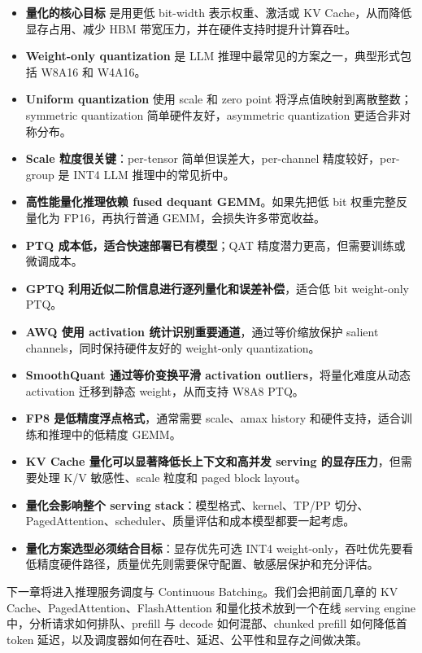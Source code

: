 \begin{itemize}
\item \textbf{量化的核心目标} 是用更低 bit-width 表示权重、激活或 KV Cache，从而降低显存占用、减少 HBM 带宽压力，并在硬件支持时提升计算吞吐。
\item \textbf{Weight-only quantization} 是 LLM 推理中最常见的方案之一，典型形式包括 W8A16 和 W4A16。
\item \textbf{Uniform quantization} 使用 scale 和 zero point 将浮点值映射到离散整数；symmetric quantization 简单硬件友好，asymmetric quantization 更适合非对称分布。
\item \textbf{Scale 粒度很关键}：per-tensor 简单但误差大，per-channel 精度较好，per-group 是 INT4 LLM 推理中的常见折中。
\item \textbf{高性能量化推理依赖 fused dequant GEMM}。如果先把低 bit 权重完整反量化为 FP16，再执行普通 GEMM，会损失许多带宽收益。
\item \textbf{PTQ 成本低，适合快速部署已有模型}；QAT 精度潜力更高，但需要训练或微调成本。
\item \textbf{GPTQ 利用近似二阶信息进行逐列量化和误差补偿}，适合低 bit weight-only PTQ。
\item \textbf{AWQ 使用 activation 统计识别重要通道}，通过等价缩放保护 salient channels，同时保持硬件友好的 weight-only quantization。
\item \textbf{SmoothQuant 通过等价变换平滑 activation outliers}，将量化难度从动态 activation 迁移到静态 weight，从而支持 W8A8 PTQ。
\item \textbf{FP8 是低精度浮点格式}，通常需要 scale、amax history 和硬件支持，适合训练和推理中的低精度 GEMM。
\item \textbf{KV Cache 量化可以显著降低长上下文和高并发 serving 的显存压力}，但需要处理 K/V 敏感性、scale 粒度和 paged block layout。
\item \textbf{量化会影响整个 serving stack}：模型格式、kernel、TP/PP 切分、PagedAttention、scheduler、质量评估和成本模型都要一起考虑。
\item \textbf{量化方案选型必须结合目标}：显存优先可选 INT4 weight-only，吞吐优先要看低精度硬件路径，质量优先则需要保守配置、敏感层保护和充分评估。
\end{itemize}

下一章将进入推理服务调度与 Continuous Batching。我们会把前面几章的 KV Cache、PagedAttention、FlashAttention 和量化技术放到一个在线 serving engine 中，分析请求如何排队、prefill 与 decode 如何混部、chunked prefill 如何降低首 token 延迟，以及调度器如何在吞吐、延迟、公平性和显存之间做决策。
